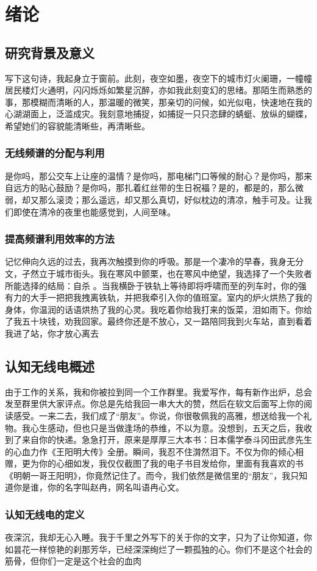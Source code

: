 
\chapter{绪论}
\section{研究背景及意义}
写下这句诗，我起身立于窗前。此刻，夜空如墨，夜空下的城市灯火阑珊，一幢幢居民楼灯火通明，闪闪烁烁如繁星沉醉，亦如我此刻变幻的思绪。那陌生而熟悉的事，那模糊而清晰的人，那温暖的微笑，那亲切的问候，如光似电，快速地在我的心湖湖面上，泛滥成灾。我刻意地捕捉，如捕捉一只只恣肆的蜻蜓、放纵的蝴蝶，希望她们的容貌能清晰些，再清晰些。
\subsection{无线频谱的分配与利用}
是你吗，那公交车上让座的温情？是你吗，那电梯门口等候的耐心？是你吗，那来自远方的贴心鼓励？是你吗，那扎着红丝带的生日祝福？是的，都是的，那么微弱，却又那么滚烫；那么遥远，却又那么真切，好似枕边的清凉，触手可及。让我们即使在清冷的夜里也能感觉到，人间至味。
\subsection{提高频谱利用效率的方法}
记忆伸向久远的过去，我再次触摸到你的呼吸。那是一个凄冷的早春，我身无分文，孑然立于城市街头。我在寒风中颤栗，也在寒风中绝望，我选择了一个失败者所能选择的结局：自杀 。当我横卧于铁轨上等待即将呼啸而至的列车时，你的强有力的大手一把把我拽离铁轨，并把我牵引入你的值班室。室内的炉火烘热了我的身体，你温润的话语烘热了我的心灵。我吃着你给我打来的饭菜，泪如雨下。你给了我五十块钱，劝我回家。最终你还是不放心，又一路陪同我到火车站，直到看着我进了站，你才放心离去
\section{认知无线电概述}
由于工作的关系，我和你被拉到同一个工作群里。我爱写作，每有新作出炉，总会发至群里供大家评点。你总是先给我回一串大大的赞，然后在软文后面写上你的阅读感受。一来二去，我们成了“朋友”。你说，你很敬佩我的高雅，想送给我一个礼物。我心生感动，但也只是当做逢场的恭维，不以为意。没想到，五天之后，我收到了来自你的快递。急急打开，原来是厚厚三大本书：日本儒学泰斗冈田武彦先生的心血力作《王阳明大传》全册。瞬间，我忍不住潸然泪下。不仅为你的倾心相赠，更为你的心细如发，我仅仅截图了我的电子书目发给你，里面有我喜欢的书《明朝一哥王阳明》，你竟然记住了。而今，我们依然是微信里的“朋友”，我只知道你是谁，你的名字叫赵冉，网名叫语冉心文。
\subsection{认知无线电的定义}
夜深沉，我却无心入睡。我于千里之外写下的关于你的文字，只为了让你知道，你如昙花一样惊艳的刹那芳华，已经深深绚烂了一颗孤独的心。你们不是这个社会的筋骨，但你们一定是这个社会的血肉
